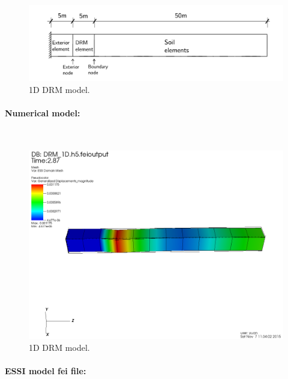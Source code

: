 \begin{figure}[!htb]
  \centering
  \includegraphics[width=18cm]{./Figure-files/_Chapter_Appendix_Illustrative_Examples/DRM_1D_descrp.pdf}
  \caption{1D DRM model.}
  \label{fig_Program_description_for_the_1D_DRM_model}
\end{figure}




\paragraph{Numerical model:} ~


\begin{figure}[!htb]
  \centering
  \includegraphics[width=15cm]{./Figure-files/_Chapter_Appendix_Illustrative_Examples/DRM_1D_result41.png}
  \caption{1D DRM model.}
  \label{fig Diagram for the 1D DRM model}
\end{figure}




\paragraph{ESSI model fei file: } ~

